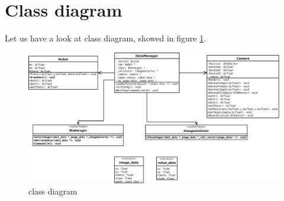 \section{Class diagram}
\label{rear:classdiagram}

Let us have a look at \framework{} class diagram, 
showed in figure \ref{fig:class_diagram}.

{
\begin{figure}[!h]
  \begin{center}
    \includegraphics[width=\textheight, angle=90]{img/rear_class_diagram.png}
    \caption{\framework{} class diagram}
    \label{fig:class_diagram}
  \end{center}
\end{figure}
}

